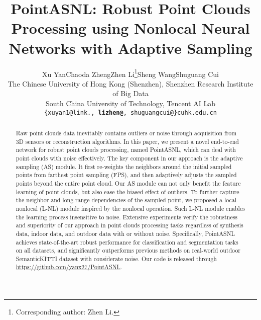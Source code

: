\documentclass[10pt,twocolumn,letterpaper]{article}
\begin{document}
	
\title{PointASNL: Robust Point Clouds Processing using Nonlocal Neural Networks with Adaptive Sampling}
	


	\author{Xu Yan\quad Chaoda Zheng\quad Zhen Li\thanks{{ Corresponding author: Zhen Li.}}\quad Sheng Wang\quad Shuguang Cui \\
		 The Chinese University of Hong Kong (Shenzhen), Shenzhen Research Institute of Big Data \\ 
		South China University of Technology, Tencent AI Lab\\
{\tt\small	\{xuyan1@link., \textbf{lizhen@}, shuguangcui@\}cuhk.edu.cn}}
	\maketitle


\begin{abstract}
		


		
		Raw point clouds data inevitably contains outliers or noise through acquisition from 3D sensors or reconstruction algorithms. In this paper, we present a novel end-to-end network for robust point clouds processing, named PointASNL, which can deal with point clouds with noise effectively. The key component in our approach is the adaptive sampling (AS) module. It first re-weights the neighbors around the initial sampled points from farthest point sampling (FPS), and then adaptively adjusts the sampled points beyond the entire point cloud. Our AS module can not only benefit the feature learning of point clouds, but also ease the biased effect of outliers. To further capture the neighbor and long-range dependencies of the sampled point, we proposed a local-nonlocal (L-NL) module inspired by the nonlocal operation. Such L-NL module enables the learning process insensitive to noise. Extensive experiments verify the robustness and superiority of our approach in point clouds processing tasks regardless of synthesis data, indoor data, and outdoor data with or without noise. Specifically, PointASNL achieves state-of-the-art robust performance for classification and segmentation tasks on all datasets, and significantly outperforms previous methods on real-world outdoor SemanticKITTI dataset with considerate noise. Our code is released through {\url{https://github.com/yanx27/PointASNL}}.
		




	\end{abstract}
	
\end{document}
